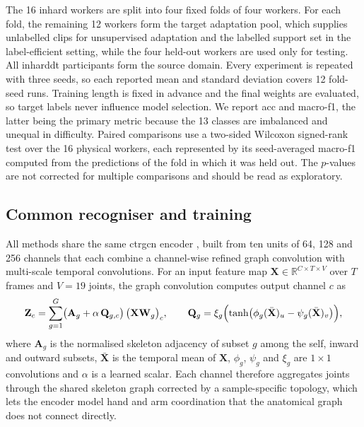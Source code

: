 \documentclass[]{interact}
\begin{document}
The 16 \ac{inhard} workers are split into four fixed folds of four workers.
For each fold, the remaining 12 workers form the target adaptation pool, which
supplies unlabelled clips for unsupervised adaptation and the labelled support
set in the label-efficient setting, while the four held-out workers are used
only for testing. All \ac{inharddt} participants form the source domain. Every
experiment is repeated with three seeds, so each reported mean and standard
deviation covers 12 fold-seed runs. Training length is fixed in advance and
the final weights are evaluated, so target labels never influence model
selection. We report \ac{acc} and macro-\ac{f1}, the latter being the primary
metric because the 13 classes are imbalanced and unequal in difficulty. Paired
comparisons use a two-sided Wilcoxon signed-rank test over the 16 physical
workers, each represented by its seed-averaged macro-\ac{f1} computed from the
predictions of the fold in which it was held out. The $p$-values are not
corrected for multiple comparisons and should be read as exploratory.

\subsection{Common recogniser and training}

All methods share the same \ac{ctrgcn} encoder \citep{chen2021ctrgcn}, built
from ten units of 64, 128 and 256 channels that each combine a channel-wise
refined graph convolution with multi-scale temporal convolutions. For an input
feature map $\mathbf{X}\in\mathbb{R}^{C\times T\times V}$ over $T$ frames and
$V=19$ joints, the graph convolution computes output channel $c$ as
\begin{equation}
  \mathbf{Z}_c=\sum_{g=1}^{G}\bigl(\mathbf{A}_g+\alpha\,\mathbf{Q}_{g,c}\bigr)\,
  \bigl(\mathbf{X}\mathbf{W}_g\bigr)_c,\qquad
  \mathbf{Q}_{g}=\xi_g\Bigl(\tanh\bigl(\phi_g(\bar{\mathbf{X}})_u-\psi_g(\bar{\mathbf{X}})_v\bigr)\Bigr),
  \label{eq:ctrgc}
\end{equation}
where $\mathbf{A}_g$ is the normalised skeleton adjacency of subset $g$ among
the self, inward and outward subsets, $\bar{\mathbf{X}}$ is the temporal mean
of $\mathbf{X}$, $\phi_g$, $\psi_g$ and $\xi_g$ are $1\times1$ convolutions and
$\alpha$ is a learned scalar. Each channel therefore aggregates joints through
the shared skeleton graph corrected by a sample-specific topology, which lets
the encoder model hand and arm coordination that the anatomical graph does not
connect directly.
\end{document}
